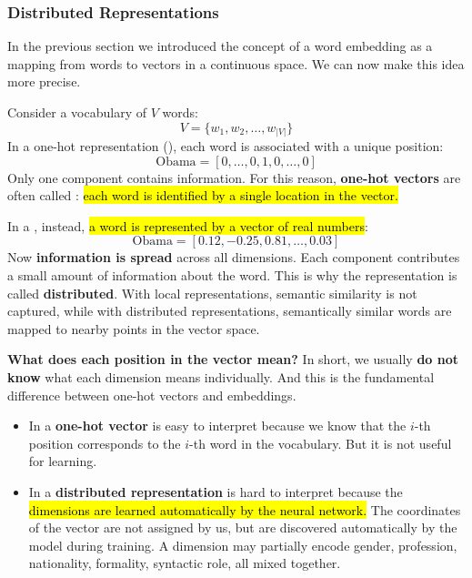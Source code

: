 \subsubsection{Distributed Representations}\label{sec:distributed-representations}

In the previous section we introduced the concept of a word embedding as a mapping from words to vectors in a continuous space. We can now make this idea more precise.

\highspace
Consider a vocabulary of $V$ words:
\begin{equation*}
    V = \{w_1, w_2, \ldots, w_{\left|V\right|}\}
\end{equation*}
In a one-hot representation (), each word is associated with a unique position:
\begin{equation*}
    \text{Obama} = \left[0, \dots, 0, 1, 0, \dots, 0\right]
\end{equation*}
Only one component contains information. For this reason, \textbf{one-hot vectors} are often called : \hl{each word is identified by a single location in the vector.}

\highspace
In a , instead, \hl{a word is represented by a vector of real numbers}:
\begin{equation*}
    \text{Obama} = \left[0.12, -0.25, 0.81, \dots, 0.03\right]
\end{equation*}
Now \textbf{information is spread} across all dimensions. Each component contributes a small amount of information about the word. This is why the representation is called \textbf{distributed}. With local representations, semantic similarity is not captured, while with distributed representations, semantically similar words are mapped to nearby points in the vector space.

\highspace
\textcolor{Green3}{ \textbf{What does each position in the vector mean?}} In short, we usually \textbf{do not know} what each dimension means individually. And this is the fundamental difference between one-hot vectors and embeddings.
\begin{itemize}
    \item In a \textbf{one-hot vector} is easy to interpret because we know that the $i$-th position corresponds to the $i$-th word in the vocabulary. But it is not useful for learning.
    \item In a \textbf{distributed representation} is hard to interpret because the \hl{dimensions are learned automatically by the neural network.} The coordinates of the vector are not assigned by us, but are discovered automatically by the model during training. A dimension may partially encode gender, profession, nationality, formality, syntactic role, all mixed together.
\end{itemize}

